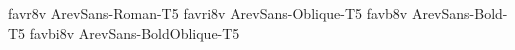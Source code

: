 \documentclass[test]{vnsample}
\begin{document}
\begin{shortsample}
  {favr8v}  {ArevSans-Roman-T5}
 {favri8v} {ArevSans-Oblique-T5}
  {favb8v}  {ArevSans-Bold-T5}
 {favbi8v} {ArevSans-BoldOblique-T5}
\end{shortsample}
\end{document}
